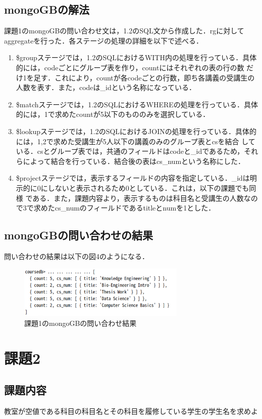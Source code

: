 \documentclass[dvipdfmx]{jarticle}
\begin{document}
\subsection{mongoGBの解法}
課題1のmongoGBの問い合わせ文は，1.2のSQL文から作成した．rgに対してaggregateを行った．各ステージの処理の詳細を以下で述べる．
\begin{enumerate}
    \item \$groupステージでは，1.2のSQLにおけるWITH内の処理を行っている．具体的には，codeごとにグループ表を作り，countにはそれぞれの表の行の数
    だけ1を足す．これにより，countが各codeごとの行数，即ち各講義の受講生の人数を表す．また，codeは\_idという名称になっている．
    \item \$matchステージでは，1.2のSQLにおけるWHEREの処理を行っている．具体的には，1で求めたcountが5以下のもののみを選択している．
    \item \$lookupステージでは，1.2のSQLにおけるJOINの処理を行っている．具体的には，1,2で求めた受講生が5人以下の講義のみのグループ表とcsを結合
    している．csとグループ表では，共通のフィールドはcodeと\_idであるため，それらによって結合を行っている．結合後の表はcs\_numという名称にした．
    \item \$projectステージでは，表示するフィールドの内容を指定している．\_idは明示的に0にしないと表示されるため0としている．これは，以下の課題でも同様
    である．また，課題内容より，表示するものは科目名と受講生の人数なので3で求めたcs\_numのフィールドであるtitleとnumを1とした．
\end{enumerate}
\subsection{mongoGBの問い合わせの結果}
問い合わせの結果は以下の図4のようになる．
\begin{figure}[h]
    \centering
    \includegraphics[width=8cm]{mongo1_result.png}
    \caption{課題1のmongoGBの問い合わせ結果}
\end{figure}
\section{課題2}
\subsection{課題内容}
教室が空値である科目の科目名とその科目を履修している学生の学生名を求めよ
\end{document}
